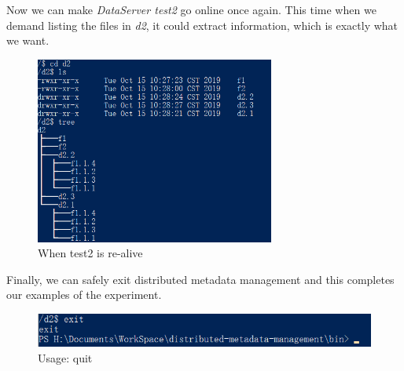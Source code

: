 \documentclass[10pt]{article}
\begin{document}
Now we can make \textit{DataServer test2} go online once again. This time when we demand 
listing the files in \textit{d2}, it could extract information, which is exactly what we want.

\begin{figure}[H]
\centerline{\includegraphics[width = 0.7\textwidth]{images//8 when test2 is realive.png}}
\caption{When test2 is re-alive}
\end{figure}

Finally, we can safely exit distributed metadata management and this completes our examples of the experiment.

\begin{figure}[H]
\centerline{\includegraphics[width = 1\textwidth]{images//9 exit.png}}
\caption{Usage: quit}
\end{figure}

\end{document}
